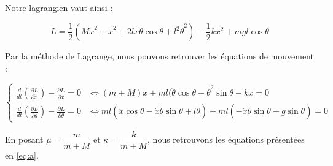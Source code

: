 Notre lagrangien vaut ainsi : 

    \begin{equation}
        L = \frac{1}{2}(M\dot{x}^2 + \dot{x}^2 + 2l\dot{x}\dot{\theta}\cos\theta + l^2\dot{\theta}^2) -\frac{1}{2}kx^2 + mgl\cos\theta
    \end{equation}
    
    
Par la méthode de Lagrange, nous pouvons retrouver les équations de mouvement :

    \begin{equation}
        \left\{\begin{array}{ll}
         \frac{d}{dt}\left(\frac{\partial L}{\partial \dot{x}}\right) - \frac{\partial L}{\partial x} = 0 & \Leftrightarrow (m+M)\ddot{x} + ml(\ddot{\theta}\cos\theta - \dot{\theta}^2\sin\theta - kx = 0\\
         \frac{d}{dt}\left(\frac{\partial L}{\partial \dot{\theta}}\right) - \frac{\partial L}{\partial \theta} = 0 & \Leftrightarrow ml(\ddot{x}\cos\theta - \dot{x}\dot{\theta}\sin\theta + l\ddot{\theta}) - ml(-\dot{x}\dot{\theta}\sin\theta - g\sin\theta) = 0
        \end{array}\right.
    \end{equation}
    
En posant $\mu = \dfrac{m}{m+M}$ et $\kappa = \dfrac{k}{m+M}$, nous retrouvons les équations présentées
en \autoref{eq:a}.
